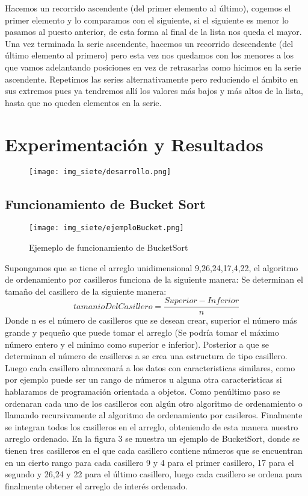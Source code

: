 \documentclass[12pt,twoside]{article}
\begin{document}
Hacemos un recorrido ascendente (del primer elemento al último), cogemos el primer elemento y lo comparamos con el siguiente, si el siguiente es menor lo pasamos al puesto anterior, de esta forma al final de la lista nos queda el mayor. Una vez terminada la serie ascendente, hacemos un recorrido descendente (del último elemento al primero) pero esta vez nos quedamos con los menores a los que vamos adelantando posiciones en vez de retrasarlas como hicimos en la serie ascendente. Repetimos las series alternativamente pero reduciendo el ámbito en sus extremos pues ya tendremos allí los valores más bajos y más altos de la lista, hasta que no queden elementos en la serie.
\section{Experimentación y Resultados}
\begin{figure}[H]
\centering
\texttt{[image: img\_siete/desarrollo.png]}
\end{figure}
\subsection*{Funcionamiento de Bucket Sort}
\begin{figure}[H]
\centering
\texttt{[image: img\_siete/ejemploBucket.png]}
\caption{Ejemeplo de funcionamiento de BucketSort}
\end{figure}
Supongamos que se tiene el arreglo unidimensional 9,26,24,17,4,22, el algoritmo de ordenamiento por casilleros funciona de la siguiente manera:
\newline
Se determinan el tamaño del casillero de la siguiente manera:
\[ tamanioDelCasillero=\frac{Superior-Inferior}{n} \]
Donde n es el número de casilleros que se desean crear, superior el número más grande y pequeño que puede tomar el arreglo (Se podría tomar el máximo número entero y el minimo como superior e inferior).
\newline
Posterior a que se determinan el número de casilleros a se crea una estructura de tipo casillero.
\newline
Luego cada casillero almacenará a los datos con caracteristicas similares, como por ejemplo puede ser un rango de números u alguna otra caracteristicas si hablaramos de programación orientada a objetos.
\newline
Como penúltimo paso se ordenaran cada uno de los casilleros con algún otro algoritmo de ordenamiento o llamando recursivamente al algoritmo de ordenamiento por casileros.
\newline
Finalmente se integran todos los casilleros en el arreglo, obteniendo de esta manera nuestro arreglo ordenado.
\newline
En la figura 3 se muestra un ejemplo de BucketSort, donde se tienen tres casilleros en el que cada casillero contiene números que se encuentran en un cierto rango para cada casillero 9 y 4 para el primer casillero, 17 para el segundo y 26,24 y 22 para el último casillero, luego cada casillero se ordena para finalmente obtener el arreglo de interés ordenado.
\caption{Ejemeplo de funcionamiento de BucketSort}
\end{document}
